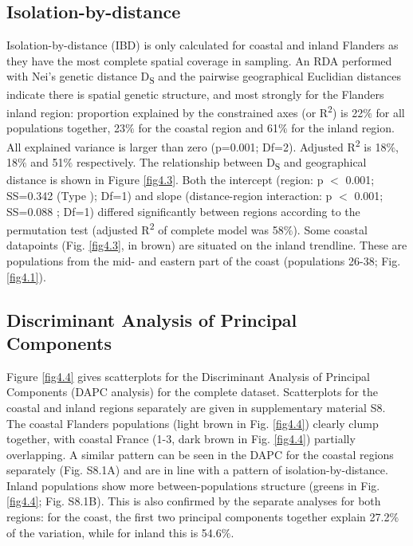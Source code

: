 \documentclass[10pt, twoside]{book} %
\begin{document}
	\subsection{Isolation-by-distance}
	Isolation-by-distance (IBD) is only calculated for coastal and inland Flanders as they have the most complete spatial coverage in sampling. An RDA performed with Nei's genetic distance D\textsubscript{S} and the pairwise geographical Euclidian distances indicate there is spatial genetic structure, and most strongly for the Flanders inland region: proportion explained by the constrained axes (or R\textsuperscript{2}) is 22$\%$ for all populations together, 23$\%$ for the coastal region and 61$\%$ for the inland region. All explained variance is larger than zero (p=0.001; Df=2). Adjusted R\textsuperscript{2} is 18$\%$, 18$\%$ and 51$\%$ respectively. The relationship between D\textsubscript{S} and geographical distance is shown in Figure \ref{fig4.3}. Both the intercept (region: p $<$ 0.001; SS=0.342 (Type ); Df=1) and slope (distance-region interaction: p $<$ 0.001; SS=0.088 ; Df=1) differed significantly between regions according to the permutation test (adjusted R\textsuperscript{2} of complete model was 58$\%$). Some coastal datapoints (Fig. \ref{fig4.3}, in brown) are situated on the inland trendline. These are populations from the mid- and eastern part of the coast (populations 26-38; Fig. \ref{fig4.1}).\\
	
	\subsection{Discriminant Analysis of Principal Components}
	Figure \ref{fig4.4} gives scatterplots for the Discriminant Analysis of Principal Components (DAPC analysis) for the complete dataset. Scatterplots for the coastal and inland regions separately are given in supplementary material S8. The coastal Flanders populations (light brown in Fig. \ref{fig4.4}) clearly clump together, with coastal France (1-3, dark brown in Fig. \ref{fig4.4}) partially overlapping. A similar pattern can be seen in the DAPC for the coastal regions separately (Fig. S8.1A) and are in line with a pattern of isolation-by-distance. Inland populations show more between-populations structure (greens in Fig. \ref{fig4.4}; Fig. S8.1B). This is also confirmed by the separate analyses for both regions: for the coast, the first two principal components together explain 27.2$\%$ of the variation, while for inland this is 54.6$\%$.\\
	
\end{document}
